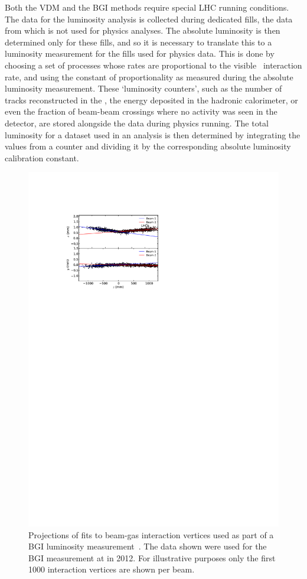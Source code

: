 Both the \ac{VDM} and the \ac{BGI} methods require special \ac{LHC} running 
conditions.
The data for the luminosity analysis is collected during dedicated fills, the 
data from which is not used for physics analyses.
The absolute luminosity is then determined only for these fills, and so it is 
necessary to translate this to a luminosity measurement for the fills used for 
physics data.
This is done by choosing a set of processes whose rates are proportional to the 
visible \pp\ interaction rate, and using the constant of proportionality as 
measured during the absolute luminosity measurement.
These `luminosity counters', such as the number of tracks reconstructed in the 
\velo, the energy deposited in the hadronic calorimeter, or even the fraction 
of beam-beam crossings where no activity was seen in the detector, are stored 
alongside the data during physics running.
The total luminosity for a dataset used in an analysis is then determined by 
integrating the values from a counter and dividing it by the corresponding 
absolute luminosity calibration constant.

\begin{figure}
  \centering
  \includegraphics[width=\textwidth]{figures/production/bgi_fits}
  \caption{%
    Projections of fits to beam-gas interaction vertices used as part of a 
    \acl{BGI} luminosity measurement~\cite{LHCb-PAPER-2014-047}.
    The data shown were used for the \ac{BGI} measurement at  in 
    2012.
    For illustrative purposes only the first \num{1000} interaction vertices 
    are shown per beam.
  }
  \label{fig:prod:data:lumi:bgi_fits}
\end{figure}
